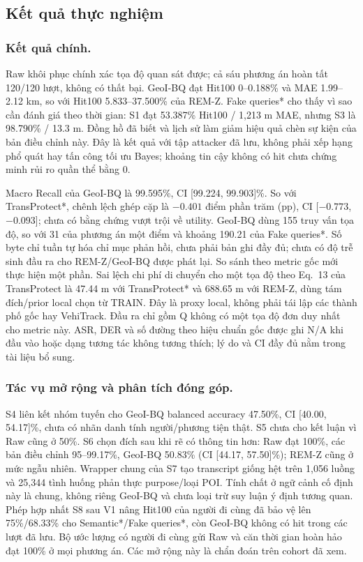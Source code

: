 \subsection{Kết quả thực nghiệm}
\subsubsection{Kết quả chính.}


Raw khôi phục chính xác tọa độ quan sát được; cả sáu phương án hoàn tất
120/120 lượt, không có thất bại. GeoI-BQ đạt Hit100 0--0.188\% và MAE
1.99--2.12 km, so với Hit100 5.833--37.500\% của REM-Z.
Fake queries* cho thấy vì sao cần đánh giá theo thời gian: S1 đạt
53.387\% Hit100 / 1,213 m MAE, nhưng S3 là 98.790\% / 13.3 m.
Đồng hồ đã biết và lịch sử làm giảm hiệu quả chèn sự kiện của bản điều chỉnh
này. Đây là kết quả với tập attacker đã lưu, không phải xếp hạng phổ quát
hay tấn công tối ưu Bayes; khoảng tin cậy không có hit chưa chứng minh rủi ro
quần thể bằng 0.

Macro Recall của GeoI-BQ là 99.595\%, CI [99.224, 99.903]\%.
So với TransProtect*, chênh lệch ghép cặp là $-0.401$ điểm phần trăm (pp),
CI [$-0.773$,$-0.093$]; chưa có bằng chứng vượt trội về utility.
GeoI-BQ dùng 155 truy vấn tọa độ, so với 31 của phương án một điểm và khoảng
190.21 của Fake queries*. Số byte chỉ tuần tự hóa chỉ mục phản hồi, chưa phải
bản ghi đầy đủ; chưa có độ trễ sinh đầu ra cho REM-Z/GeoI-BQ được phát lại.
So sánh theo metric gốc mới thực hiện một phần. Sai lệch chi phí di chuyển
cho một tọa độ theo Eq.~13 của TransProtect là 47.44 m với TransProtect* và
688.65 m với REM-Z, dùng tám đích/prior local chọn từ TRAIN. Đây là proxy
local, không phải tái lập các thành phố gốc hay VehiTrack. Đầu ra chỉ gồm Q
không có một tọa độ đơn duy nhất cho metric này. ASR, DER và số đường theo
hiệu chuẩn gốc được ghi N/A khi đầu vào hoặc dạng tương tác không tương thích;
lý do và CI đầy đủ nằm trong tài liệu bổ sung.

\subsubsection{Tác vụ mở rộng và phân tích đóng góp.}
S4 liên kết nhóm tuyến cho GeoI-BQ balanced accuracy 47.50\%,
CI [40.00, 54.17]\%, chưa có nhãn danh tính người/phương tiện thật.
S5 chưa cho kết luận vì Raw cũng ở 50\%.
S6 chọn đích sau khi rẽ có thông tin hơn: Raw đạt 100\%, các bản điều chỉnh
95--99.17\%, GeoI-BQ 50.83\% (CI [44.17, 57.50]\%); REM-Z cũng ở mức ngẫu nhiên.
Wrapper chung của S7 tạo transcript giống hệt trên 1,056 luồng và 25,344
tình huống phản thực purpose/loại POI. Tính chất ở ngữ cảnh cố định này là
chung, không riêng GeoI-BQ và chưa loại trừ suy luận ý định tương quan.
Phép hợp nhất S8 sau V1 nâng Hit100 của người đi cùng đã bảo vệ lên
75\%/68.33\% cho Semantic*/Fake queries*, còn GeoI-BQ không có hit trong các
lượt đã lưu. Bộ ước lượng có người đi cùng gửi Raw và căn thời gian hoàn hảo
đạt 100\% ở mọi phương án. Các mở rộng này là chẩn đoán trên cohort đã xem.

